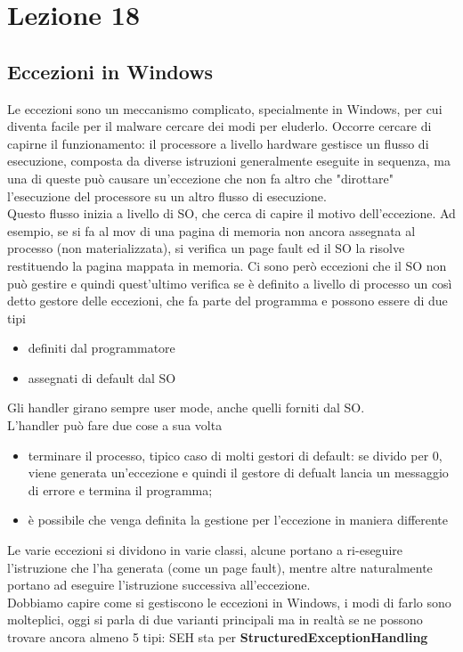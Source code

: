 \documentclass[12pt, oneside]{extbook}
\begin{document}
\chapter{Lezione 18}
\section{Eccezioni in Windows}
Le eccezioni sono un meccanismo complicato, specialmente in Windows, per cui diventa facile per il malware cercare dei modi per eluderlo. Occorre cercare di capirne il funzionamento: il processore a livello hardware gestisce un flusso di esecuzione, composta da diverse istruzioni generalmente eseguite in sequenza, ma una di queste può causare un'eccezione che non fa altro che "dirottare" l'esecuzione del processore su un altro flusso di esecuzione.\\Questo flusso inizia a livello di SO, che cerca di capire il motivo dell'eccezione. Ad esempio, se si fa al mov di una pagina di memoria non ancora assegnata al processo (non materializzata), si verifica un page fault ed il SO la risolve restituendo la pagina mappata in memoria. Ci sono però eccezioni che il SO non può gestire e quindi quest'ultimo verifica se è definito a livello di processo un così detto gestore delle eccezioni, che fa parte del programma e possono essere di due tipi
\begin{itemize}
\item definiti dal programmatore
\item assegnati di default dal SO
\end{itemize}
Gli handler girano sempre user mode, anche quelli forniti dal SO.\\L'handler può fare due cose a sua volta
\begin{itemize}
\item terminare il processo, tipico caso di molti gestori di default: se divido per 0, viene generata un'eccezione e quindi il gestore di defualt lancia un messaggio di errore e termina il programma;
\item è possibile che venga definita la gestione per l'eccezione in maniera differente
\end{itemize}
Le varie eccezioni si dividono in varie classi, alcune portano a ri-eseguire l'istruzione che l'ha generata (come un page fault), mentre altre naturalmente portano ad eseguire l'istruzione successiva all'eccezione.\\Dobbiamo capire come si gestiscono le eccezioni in Windows, i modi di farlo sono molteplici, oggi si parla di due varianti principali ma in realtà se ne possono trovare ancora almeno 5 tipi: SEH sta per \textbf{StructuredExceptionHandling}
\end{document}
